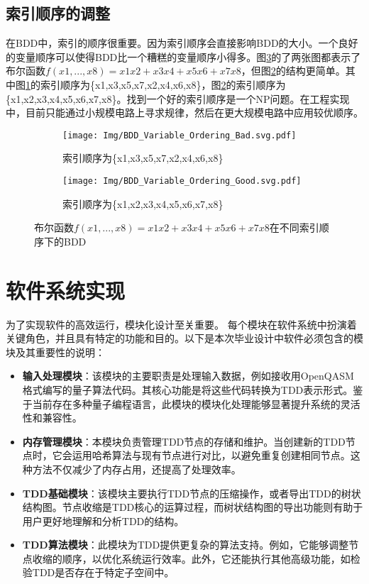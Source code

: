 \subsection*{索引顺序的调整}
\label{contraction}在BDD中，索引的顺序很重要。因为索引顺序会直接影响BDD的大小。一个良好的变量顺序可以使得BDD比一个糟糕的变量顺序小得多。图\ref{fig:bdd-compare}的了两张图都表示了布尔函数$f (x1,...,x8)=x1x2+x3x4+x5x6+x7x8$，但图\ref{fig:bdd-good}的结构更简单。其中图\ref{fig:bdd-bad}的索引顺序为\{x1,x3,x5,x7,x2,x4,x6,x8\}，图\ref{fig:bdd-good}的索引顺序为\{x1,x2,x3,x4,x5,x6,x7,x8\}。找到一个好的索引顺序是一个NP问题。在工程实现中，目前只能通过小规模电路上寻求规律，然后在更大规模电路中应用较优顺序。
\begin{figure}[!htbp]
	\centering
	\begin{subfigure}[b]{.4\textwidth}
        \centering
        \texttt{[image: Img/BDD\_Variable\_Ordering\_Bad.svg.pdf]}
		\caption{索引顺序为\{x1,x3,x5,x7,x2,x4,x6,x8\}}
		\label{fig:bdd-bad}
	\end{subfigure}
    \qquad
	\begin{subfigure}[b]{.4\textwidth}
        \centering
        \texttt{[image: Img/BDD\_Variable\_Ordering\_Good.svg.pdf]}
		\caption{索引顺序为\{x1,x2,x3,x4,x5,x6,x7,x8\}}
		\label{fig:bdd-good}
	\end{subfigure}
	\caption{布尔函数$f (x1,...,x8)=x1x2+x3x4+x5x6+x7x8$在不同索引顺序下的BDD\citep{wiki:bdd}}
	\label{fig:bdd-compare}
\end{figure}

\section{软件系统实现}
为了实现软件的高效运行，模块化设计至关重要。
每个模块在软件系统中扮演着关键角色，并且具有特定的功能和目的。以下是本次毕业设计中软件必须包含的模块及其重要性的说明：
\begin{itemize}
    \item \textbf{输入处理模块}：该模块的主要职责是处理输入数据，例如接收用OpenQASM格式编写的量子算法代码。其核心功能是将这些代码转换为TDD表示形式。鉴于当前存在多种量子编程语言，此模块的模块化处理能够显著提升系统的灵活性和兼容性。
    \item \textbf{内存管理模块}：本模块负责管理TDD节点的存储和维护。当创建新的TDD节点时，它会运用哈希算法与现有节点进行对比，以避免重复创建相同节点。这种方法不仅减少了内存占用，还提高了处理效率。
    \item \textbf{TDD基础模块}：该模块主要执行TDD节点的压缩操作，或者导出TDD的树状结构图。节点收缩是TDD核心的运算过程，而树状结构图的导出功能则有助于用户更好地理解和分析TDD的结构。
    \item \textbf{TDD算法模块}：此模块为TDD提供更复杂的算法支持。例如，它能够调整节点收缩的顺序，以优化系统运行效率。此外，它还能执行其他高级功能，如检验TDD是否存在于特定子空间中。
\end{itemize}
